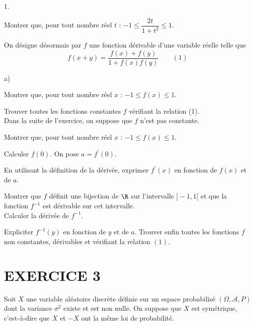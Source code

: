 \documentclass[11pt]{article}%
\begin{document}
\begin{noliste}{1.}
 \setlength{\itemsep}{4mm}
\item Montrer que, pour tout nombre réel $t$ : $-1\leq \dfrac{2t}{1 +
t^{2}}\leq 1.$

\item On désigne désormais par $f$ une fonction dérivable d'une
variable réelle telle que 
\[
f(x + y) = \dfrac{f(x) + f(y)}{1 + f(x)f(y)}\qquad (1)
\]

\begin{noliste}{a)}
 \setlength{\itemsep}{2mm}
\item Montrer que, pour tout nombre réel $x$ : $-1\leq f(x)\leq 1.$

\item Trouver toutes les fonctions constantes $f$ vérifiant la relation
(1).\\
Dans la suite de l'exercice, on suppose que $f$ n'est pas constante.

\item Montrer que, pour tout nombre réel $x$ : $-1\leq f(x)\leq 1.$

\item Calculer $f(0).$ On pose $a = f^{\prime }(0).$

\item En utilisant la définition de la dérivée, exprimer $f^{\prime
}(x)$ en
fonction de $f(x)$ et de $a.$

\item Montrer que $f$ définit une bijection de $\R$ sur l'intervalle 
$]-1,1[$ et que la fonction $f^{-1}$ est dérivable sur cet
intervalle.\\
Calculer la dérivée de $f^{-1}.$

\item Expliciter $f^{-1}(y)$ en fonction de $y$ et de $a.$ Trouver
enfin
toutes les fonctions $f$ non constantes, dérivables et vérifiant la
relation 
$(1).$
\end{noliste}
\end{noliste}

\section*{EXERCICE 3}

Soit $X$ une variable aléatoire discrète définie sur un espace
probabilisé $(\Omega,\mathcal{A},P)$ dont la variance $\sigma ^{2}$
existe et est non
nulle. On suppose que $X$ est symétrique, c'est-à-dire que $X$ et $-X$
ont
la même loi de probabilité.
\end{document}
